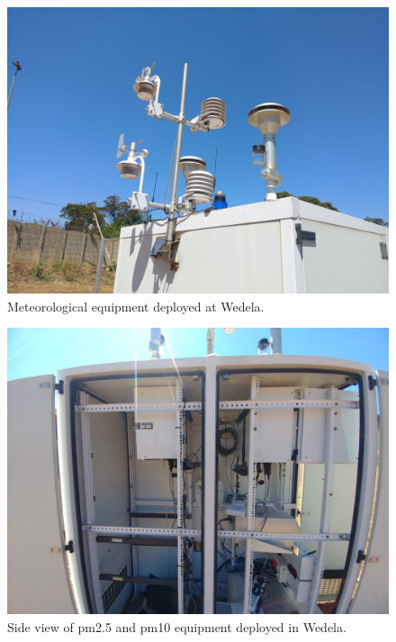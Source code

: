 \documentclass{nwureport}
\begin{document}
\begin{figure}[!htb]
    \centering
    \includegraphics[width=\textwidth]{images/wedela.jpeg}
    \caption[Meteorological equipment deployed at Wedela.]{Meteorological equipment deployed at Wedela.}
    \label{fig:wadela_instruments_met}
\end{figure}

\begin{figure}[!htb]
    \centering
    \includegraphics[width=\textwidth]{images/wadela_10.jpeg}
    \caption[Side view of $PM_{2.5}$ and $PM_{10}$ equipment deployed in Wedela.]{Side view of \gls{pm2.5} and \gls{pm10} equipment deployed in Wedela.}
    \label{fig:wadela_instruments_pm}
\end{figure}
\end{document}
